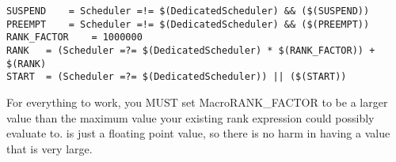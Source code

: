 \begin{verbatim}
SUSPEND    = Scheduler =!= $(DedicatedScheduler) && ($(SUSPEND))
PREEMPT    = Scheduler =!= $(DedicatedScheduler) && ($(PREEMPT))
RANK_FACTOR    = 1000000
RANK   = (Scheduler =?= $(DedicatedScheduler) * $(RANK_FACTOR)) + $(RANK)
START  = (Scheduler =?= $(DedicatedScheduler)) || ($(START))
\end{verbatim}

\Note For everything to work, you MUST set Macro{RANK\_FACTOR} to be a
larger value than the maximum value your existing rank expression
could possibly evaluate to.
 is just a floating point value, so there is no harm in
having a value that is very large. 


